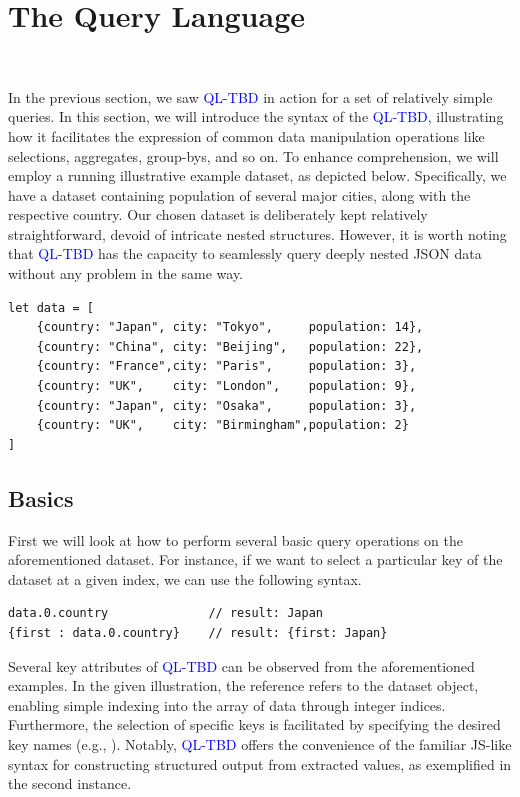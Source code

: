\documentclass[runningheads]{llncs}
\newcommand{\lang}{\textcolor{blue}{QL-TBD}}
\begin{document}
\section{The Query Language}~\label{sec:query_language}

In the previous section, we saw \lang{} in action for a set of relatively simple queries.
In this section, we will introduce the syntax of the \lang{}, illustrating how it facilitates
the expression of common data manipulation operations like selections, aggregates,
group-bys, and so on.
To enhance comprehension, we will employ a running illustrative example dataset, as
depicted below.
Specifically, we have a dataset containing population of several major cities,
along with the respective country.
Our chosen dataset is deliberately kept relatively straightforward, devoid of
intricate nested structures.
However, it is worth noting that \lang{} has the capacity to seamlessly query
deeply nested JSON data without any problem in the same way.


\begin{lstlisting}[style=JavaScript]
let data = [
    {country: "Japan", city: "Tokyo",     population: 14},
    {country: "China", city: "Beijing",   population: 22},
    {country: "France",city: "Paris",     population: 3},
    {country: "UK",    city: "London",    population: 9},
    {country: "Japan", city: "Osaka",     population: 3},
    {country: "UK",    city: "Birmingham",population: 2}
]
\end{lstlisting}

\subsection{Basics}
First we will look at how to perform several basic query operations on the
aforementioned dataset.
For instance, if we want to select a particular key of the dataset at a given
index, we can use the following syntax.

\begin{lstlisting}[style=JavaScript]
data.0.country              // result: Japan
{first : data.0.country}    // result: {first: Japan}
\end{lstlisting}

Several key attributes of \lang{} can be observed from the aforementioned examples.
In the given illustration, the reference  refers to
the dataset object, enabling simple indexing into the array of data through integer
indices.
Furthermore, the selection of specific keys is facilitated by specifying the desired
key names (e.g., ).
Notably, \lang{} offers the convenience of the familiar JS-like syntax for constructing
structured output from extracted values, as exemplified in the second instance.
\end{document}

